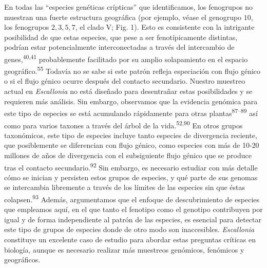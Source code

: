 \documentclass[
  11pt,
]{article}
\begin{document}
En todas las ``especies genéticas crípticas'' que identificamos, los fenogrupos no muestran una fuerte estructura geográfica (por ejemplo, véase el genogrupo \(10\), los fenogrupos \(2, 3, 5, 7\), el clado V; Fig. 1). Esto es consistente con la intrigante posibilidad de que estas especies, que pese a ser fenotípicamente distintas, podrían estar potencialmente interconectadas a través del intercambio de genes,\textsuperscript{40,41} probablemente facilitado por su amplio solapamiento en el espacio geográfico.\textsuperscript{55} Todavía no se sabe si este patrón refleja especiación con flujo génico o si el flujo génico ocurre después del contacto secundario. Nuestro muestreo actual en \emph{Escallonia} no está diseñado para desentrañar estas posibilidades y se requieren más análisis. Sin embargo, observamos que la evidencia genómica para este tipo de especies se está acumulando rápidamente para otras plantas\textsuperscript{87--89} así como para varios taxones a través del árbol de la vida.\textsuperscript{52,90} En otros grupos taxonómicos, este tipo de especies incluye tanto especies de divergencia reciente, que posiblemente se diferencian con flujo génico, como especies con más de 10-20 millones de años de divergencia con el subsiguiente flujo génico que se produce tras el contacto secundario.\textsuperscript{92} Sin embargo, es necesario estudiar con más detalle cómo se inician y persisten estos grupos de especies, y qué parte de sus genomas se intercambia libremente a través de los límites de las especies sin que éstas colapsen.\textsuperscript{93} Además, argumentamos que el enfoque de descubrimiento de especies que empleamos aquí, en el que tanto el fenotipo como el genotipo contribuyen por igual y de forma independiente al patrón de las especies, es esencial para detectar este tipo de grupos de especies donde de otro modo son inaccesibles. \emph{Escallonia} constituye un excelente caso de estudio para abordar estas preguntas críticas en biología, aunque es necesario realizar más muestreos genómicos, fenómicos y geográficos.
\end{document}
